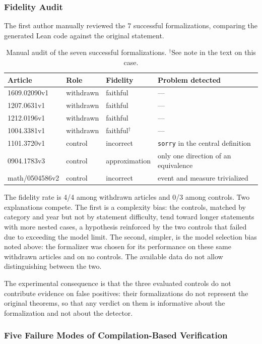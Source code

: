 \documentclass[12pt,a4paper]{article}
\theoremstyle{remark}
\begin{document}
\subsubsection{Fidelity Audit}

The first author manually reviewed the 7 successful formalizations, comparing the generated Lean code against the original statement.

\begin{table}[htbp]
\centering
\small
\begin{tabular}{llll}
\toprule
Article & Role & Fidelity & Problem detected \\
\midrule
1609.02090v1   & withdrawn & faithful & --- \\
1207.0631v1    & withdrawn & faithful & --- \\
1212.0196v1    & withdrawn & faithful & --- \\
1004.3381v1    & withdrawn & faithful$^{\dagger}$ & --- \\
1101.3720v1    & control  & incorrect & \texttt{sorry} in the central definition \\
0904.1783v3    & control  & approximation & only one direction of an equivalence \\
math/0504586v2 & control  & incorrect & event and measure trivialized \\
\bottomrule
\end{tabular}
\caption{Manual audit of the seven successful formalizations. $^{\dagger}$See note in the text on this case.}
\label{tab:fidelidad}
\end{table}

The fidelity rate is 4/4 among withdrawn articles and 0/3 among controls. Two explanations compete. The first is a complexity bias: the controls, matched by category and year but not by statement difficulty, tend toward longer statements with more nested cases, a hypothesis reinforced by the two controls that failed due to exceeding the model limit. The second, simpler, is the model selection bias noted above: the formalizer was chosen for its performance on these same withdrawn articles and on no controls. The available data do not allow distinguishing between the two.

The experimental consequence is that the three evaluated controls do not contribute evidence on false positives: their formalizations do not represent the original theorems, so that any verdict on them is informative about the formalization and not about the detector.

\subsubsection{Five Failure Modes of Compilation-Based Verification}
\label{ssec:modosfalla}
\end{document}
